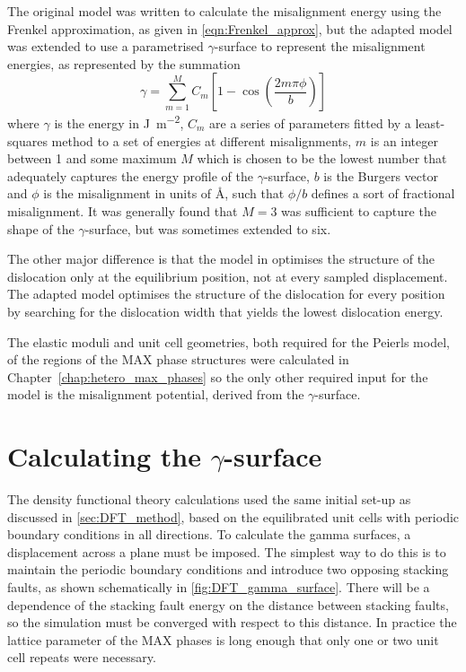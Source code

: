 The original model was written to calculate the misalignment energy using the Frenkel approximation, as given in \autoref{eqn:Frenkel_approx}, but the adapted model was extended to use a parametrised $\gamma$-surface to represent the misalignment energies, as represented by the summation
\begin{equation}
\gamma = \sum_{m=1}^{M} C_m \left[ 1 - \cos \left( \frac{2m\pi \phi}{b} \right) \right]\label{eqn:gamma_surface}
\end{equation}
where $\gamma$ is the energy in \si{\joule\per\meter\squared}, $C_m$ are a series of parameters fitted by a least-squares method to a set of energies at different misalignments, $m$ is an integer between 1 and some maximum $M$ which is chosen to be the lowest number that adequately captures the energy profile of the $\gamma$-surface, $b$ is the Burgers vector and $\phi$ is the misalignment in units of \si{\angstrom}, such that $\phi/b$ defines a sort of fractional misalignment. It was generally found that $M=3$ was sufficient to capture the shape of the $\gamma$-surface, but was sometimes extended to six.

The other major difference is that the model in \cite{Clegg2006} optimises the structure of the dislocation only at the equilibrium position, not at every sampled displacement. The adapted model optimises the structure of the dislocation for every position by searching for the dislocation width that yields the lowest dislocation energy.


The elastic moduli and unit cell geometries, both required for the Peierls model, of the regions of the MAX phase structures were calculated in Chapter~\ref{chap:hetero_max_phases} so the only other required input for the model is the misalignment potential, derived from the $\gamma$-surface.

\section{Calculating the \texorpdfstring{$\gamma$}{gamma}-surface}


The density functional theory calculations used the same initial set-up as discussed in \autoref{sec:DFT_method}, based on the equilibrated unit cells with periodic boundary conditions in all directions. To calculate the gamma surfaces, a displacement across a plane must be imposed. The simplest way to do this is to maintain the periodic boundary conditions and introduce two opposing stacking faults, as shown schematically in \autoref{fig:DFT_gamma_surface}. There will be a dependence of the stacking fault energy on the distance between stacking faults, so the simulation must be converged with respect to this distance. In practice the lattice parameter of the MAX phases is long enough that only one or two unit cell repeats were necessary.

